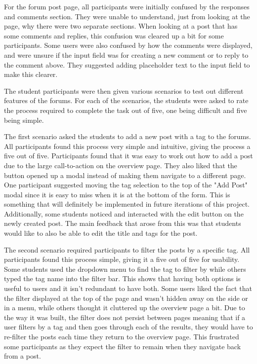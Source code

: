 For the forum post page, all participants were initially confused by the responses and comments section.
They were unable to understand, just from looking at the page, why there were two separate sections.
When looking at a post that has some comments and replies, this confusion was cleared up a bit for some participants.
Some users were also confused by how the comments were displayed, and were unsure if the input field was for creating a new comment or to reply to the comment above.
They suggested adding placeholder text to the input field to make this clearer.

The student participants were then given various scenarios to test out different features of the forums.
For each of the scenarios, the students were asked to rate the process required to complete the task out of five, one being difficult and five being simple.

The first scenario asked the students to add a new post with a tag to the forums.
All participants found this process very simple and intuitive, giving the process a five out of five.
Participants found that it was easy to work out how to add a post due to the large call-to-action on the overview page.
They also liked that the button opened up a modal instead of making them navigate to a different page.
One participant suggested moving the tag selection to the top of the "Add Post" modal since it is easy to miss when it is at the bottom of the form.
This is something that will definitely be implemented in future iterations of this project.
Additionally, some students noticed and interacted with the edit button on the newly created post.
The main feedback that arose from this was that students would like to also be able to edit the title and tags for the post.

The second scenario required participants to filter the posts by a specific tag.
All participants found this process simple, giving it a five out of five for usability.
Some students used the dropdown menu to find the tag to filter by while others typed the tag name into the filter bar.
This shows that having both options is useful to users and it isn't redundant to have both.
Some users liked the fact that the filter displayed at the top of the page and wasn't hidden away on the side or in a menu, while others thought it cluttered up the overview page a bit.
Due to the way it was built, the filter does not persist between pages meaning that if a user filters by a tag and then goes through each of the results, they would have to re-filter the posts each time they return to the overview page.
This frustrated some participants as they expect the filter to remain when they navigate back from a post.

